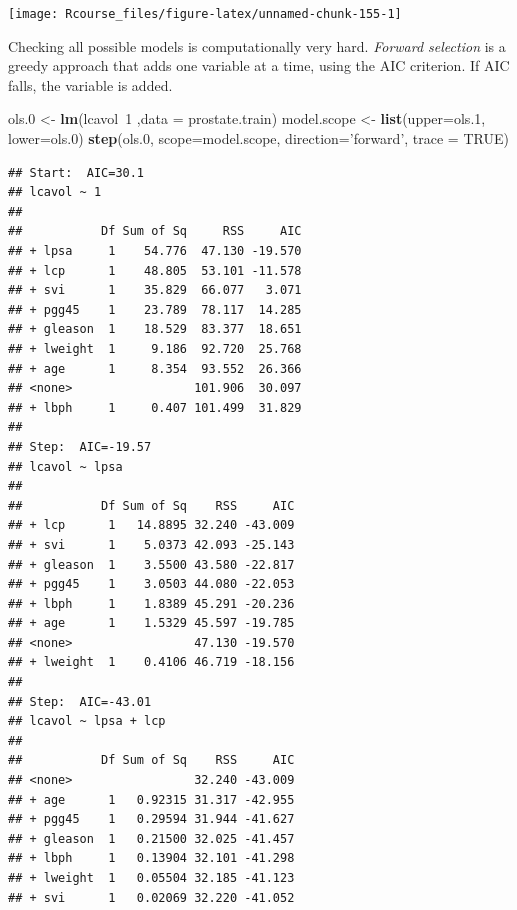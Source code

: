 \documentclass[]{book}
\newenvironment{Shaded}{\begin{snugshade}}{\end{snugshade}}
\newcommand{\KeywordTok}[1]{\textcolor[rgb]{0.13,0.29,0.53}{\textbf{{#1}}}}
\newcommand{\DataTypeTok}[1]{\textcolor[rgb]{0.13,0.29,0.53}{{#1}}}
\newcommand{\DecValTok}[1]{\textcolor[rgb]{0.00,0.00,0.81}{{#1}}}
\newcommand{\FloatTok}[1]{\textcolor[rgb]{0.00,0.00,0.81}{{#1}}}
\newcommand{\StringTok}[1]{\textcolor[rgb]{0.31,0.60,0.02}{{#1}}}
\newcommand{\OtherTok}[1]{\textcolor[rgb]{0.56,0.35,0.01}{{#1}}}
\newcommand{\NormalTok}[1]{{#1}}
\theoremstyle{definition}
\theoremstyle{definition}
\theoremstyle{remark}
\begin{document}
\texttt{[image: Rcourse\_files/figure-latex/unnamed-chunk-155-1]}

Checking all possible models is computationally very hard. \emph{Forward
selection} is a greedy approach that adds one variable at a time, using
the AIC criterion. If AIC falls, the variable is added.

\begin{Shaded}
\begin{Highlighting}[]
\NormalTok{ols}\FloatTok{.0} \NormalTok{<-}\StringTok{ }\KeywordTok{lm}\NormalTok{(lcavol~}\DecValTok{1} \NormalTok{,}\DataTypeTok{data =} \NormalTok{prostate.train)}
\NormalTok{model.scope <-}\StringTok{ }\KeywordTok{list}\NormalTok{(}\DataTypeTok{upper=}\NormalTok{ols}\FloatTok{.1}\NormalTok{, }\DataTypeTok{lower=}\NormalTok{ols}\FloatTok{.0}\NormalTok{)}
\KeywordTok{step}\NormalTok{(ols}\FloatTok{.0}\NormalTok{, }\DataTypeTok{scope=}\NormalTok{model.scope, }\DataTypeTok{direction=}\StringTok{'forward'}\NormalTok{, }\DataTypeTok{trace =} \OtherTok{TRUE}\NormalTok{)}
\end{Highlighting}
\end{Shaded}

\begin{verbatim}
## Start:  AIC=30.1
## lcavol ~ 1
## 
##           Df Sum of Sq     RSS     AIC
## + lpsa     1    54.776  47.130 -19.570
## + lcp      1    48.805  53.101 -11.578
## + svi      1    35.829  66.077   3.071
## + pgg45    1    23.789  78.117  14.285
## + gleason  1    18.529  83.377  18.651
## + lweight  1     9.186  92.720  25.768
## + age      1     8.354  93.552  26.366
## <none>                 101.906  30.097
## + lbph     1     0.407 101.499  31.829
## 
## Step:  AIC=-19.57
## lcavol ~ lpsa
## 
##           Df Sum of Sq    RSS     AIC
## + lcp      1   14.8895 32.240 -43.009
## + svi      1    5.0373 42.093 -25.143
## + gleason  1    3.5500 43.580 -22.817
## + pgg45    1    3.0503 44.080 -22.053
## + lbph     1    1.8389 45.291 -20.236
## + age      1    1.5329 45.597 -19.785
## <none>                 47.130 -19.570
## + lweight  1    0.4106 46.719 -18.156
## 
## Step:  AIC=-43.01
## lcavol ~ lpsa + lcp
## 
##           Df Sum of Sq    RSS     AIC
## <none>                 32.240 -43.009
## + age      1   0.92315 31.317 -42.955
## + pgg45    1   0.29594 31.944 -41.627
## + gleason  1   0.21500 32.025 -41.457
## + lbph     1   0.13904 32.101 -41.298
## + lweight  1   0.05504 32.185 -41.123
## + svi      1   0.02069 32.220 -41.052
\end{verbatim}
\end{document}
